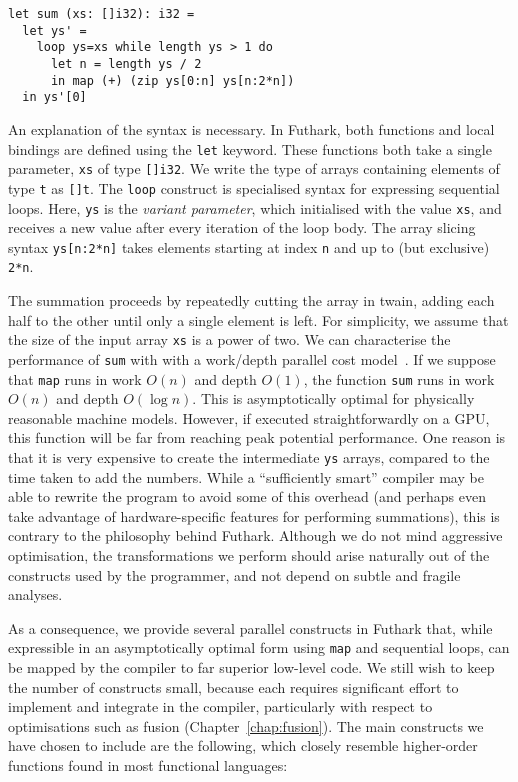 \begin{lstlisting}
let sum (xs: []i32): i32 =
  let ys' =
    loop ys=xs while length ys > 1 do
      let n = length ys / 2
      in map (+) (zip ys[0:n] ys[n:2*n])
  in ys'[0]
\end{lstlisting}

An explanation of the syntax is necessary.  In Futhark, both functions
and local bindings are defined using the \lstinline{let} keyword.
These functions both take a single parameter, \lstinline{xs} of type
\lstinline{[]i32}.  We write the type of arrays containing elements of
type \lstinline{t} as \lstinline{[]t}.  The \lstinline{loop} construct
is specialised syntax for expressing sequential loops.  Here,
\lstinline{ys} is the \textit{variant parameter}, which initialised
with the value \lstinline{xs}, and receives a new value after every
iteration of the loop body.  The array slicing syntax
\lstinline{ys[n:2*n]} takes elements starting at index \lstinline{n}
and up to (but exclusive) \lstinline{2*n}.

The summation proceeds by repeatedly cutting the array in twain,
adding each half to the other until only a single element is left.
For simplicity, we assume that the size of the input array
\lstinline{xs} is a power of two.  We can characterise the performance
of \lstinline{sum} with with a work/depth parallel cost
model~\cite{Blelloch:1995:PSF:224164.224210}.  If we suppose that
\lstinline{map} runs in work $O(n)$ and depth $O(1)$, the function
\lstinline{sum} runs in work $O(n)$ and depth $O(\log n)$.  This is
asymptotically optimal for physically reasonable machine models.
However, if executed straightforwardly on a GPU, this function will be
far from reaching peak potential performance.  One reason is that it
is very expensive to create the intermediate \lstinline{ys} arrays,
compared to the time taken to add the numbers.  While a ``sufficiently
smart'' compiler may be able to rewrite the program to avoid some of
this overhead (and perhaps even take advantage of hardware-specific
features for performing summations), this is contrary to the
philosophy behind Futhark.  Although we do not mind aggressive
optimisation, the transformations we perform should arise naturally
out of the constructs used by the programmer, and not depend on subtle
and fragile analyses.

As a consequence, we provide several parallel constructs in Futhark
that, while expressible in an asymptotically optimal form using
\lstinline{map} and sequential loops, can be mapped by the compiler to
far superior low-level code.  We still wish to keep the number of
constructs small, because each requires significant effort to
implement and integrate in the compiler, particularly with respect to
optimisations such as fusion (Chapter~\ref{chap:fusion}).  The main
constructs we have chosen to include are the following, which closely
resemble higher-order functions found in most functional languages:

